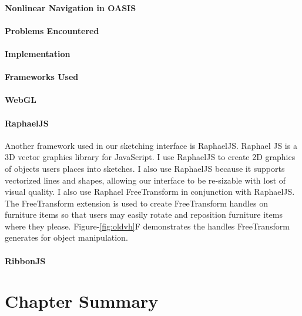 \paragraph{Nonlinear Navigation in OASIS}


\paragraph{Problems Encountered}

\paragraph{Implementation}

\paragraph{Frameworks Used}

\paragraph{WebGL}

\paragraph{RaphaelJS}
Another framework used in our sketching interface is RaphaelJS\cite{todo}.
Raphael JS is a 3D vector graphics library for JavaScript. 
I use RaphaelJS to create 2D graphics of objects users places into sketches. I also use RaphaelJS because it supports vectorized lines and shapes, allowing our interface  to be re-sizable with lost of visual quality.
I also use Raphael FreeTransform in conjunction with RaphaelJS\cite{todo}. 
The FreeTransform extension is used to create FreeTransform handles on furniture items so that users may easily rotate and reposition furniture items where they please.
Figure-\ref{fig:oldvh}F demonstrates the handles FreeTransform generates for object manipulation.\\

\paragraph{RibbonJS}

\section{Chapter Summary}

